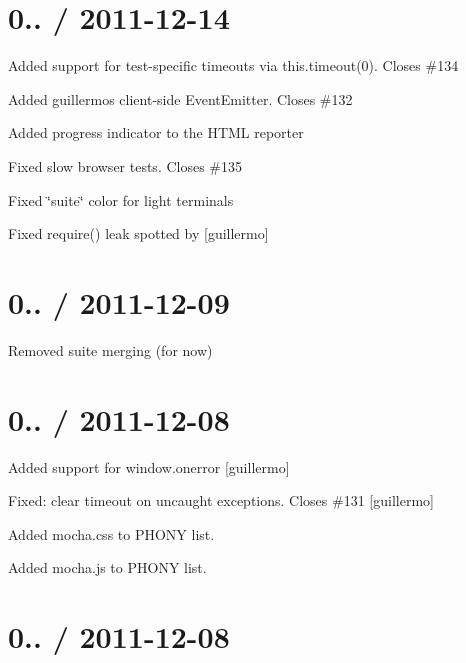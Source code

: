 \section*{0.. / 2011-\/12-\/14}


\begin{DoxyItemize}
\item Added support for test-\/specific timeouts via {\ttfamily this.\+timeout(0)}. Closes \#134
\item Added guillermo\textquotesingle{}s client-\/side Event\+Emitter. Closes \#132
\item Added progress indicator to the H\+T\+ML reporter
\item Fixed slow browser tests. Closes \#135
\item Fixed \char`\"{}suite\char`\"{} color for light terminals
\item Fixed {\ttfamily require()} leak spotted by \mbox{[}guillermo\mbox{]}
\end{DoxyItemize}

\section*{0.. / 2011-\/12-\/09}


\begin{DoxyItemize}
\item Removed suite merging (for now)
\end{DoxyItemize}

\section*{0.. / 2011-\/12-\/08}


\begin{DoxyItemize}
\item Added support for {\ttfamily window.\+onerror} \mbox{[}guillermo\mbox{]}
\item Fixed\+: clear timeout on uncaught exceptions. Closes \#131 \mbox{[}guillermo\mbox{]}
\item Added {\ttfamily mocha.\+css} to P\+H\+O\+NY list.
\item Added {\ttfamily mocha.\+js} to P\+H\+O\+NY list.
\end{DoxyItemize}

\section*{0.. / 2011-\/12-\/08}


